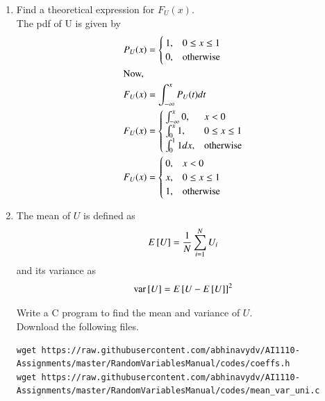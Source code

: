 \documentclass[journal,12pt,twocolumn]{IEEEtran}
\renewcommand\thesection{\arabic{section}}
\begin{document}
\begin{enumerate}[label=\thesection.\arabic*
        ,ref=\thesection.\theenumi]
    \item
          Find a  theoretical expression for $F_{U}(x)$.\\
          \solution
          The pdf of U is given by
          \begin{align}
              P_U(x) & = \begin{cases}
                  1, & 0 \le x \le 1    \\
                  0, & \text{otherwise} \\
              \end{cases}    \\
              \intertext{Now,}
              F_U(x) & = \int_{-\infty}^{x} P_U(t) dt \\
              F_U(x) & = \begin{cases}
                  \int_{-\infty}^{x} 0, & x < 0            \\
                  \int_{0}^{x}1,        & 0 \le x \le 1    \\
                  \int_0^11dx,          & \text{otherwise}
              \end{cases}    \\
              F_U(x) & = \begin{cases}
                  0, & x < 0            \\
                  x, & 0 \le x \le 1    \\
                  1, & \text{otherwise}
              \end{cases}
          \end{align}


    \item
          The mean of $U$ is defined as
          \begin{equation}
              E{}\left[U\right] = \frac{1}{N}\sum_{i=1}^{N}U_i
          \end{equation}
          and its variance as
          \begin{equation}
              \text{var}{}\left[U\right] = E{}\left[U- E{}\left[U\right]\right]^2
          \end{equation}

          Write a C program to  find the mean and variance of $U$.\\
          \solution Download the following files.
          \begin{lstlisting}
wget https://raw.githubusercontent.com/abhinavydv/AI1110-Assignments/master/RandomVariablesManual/codes/coeffs.h
wget https://raw.githubusercontent.com/abhinavydv/AI1110-Assignments/master/RandomVariablesManual/codes/mean_var_uni.c
        \end{lstlisting}


\end{enumerate}
\end{document}
